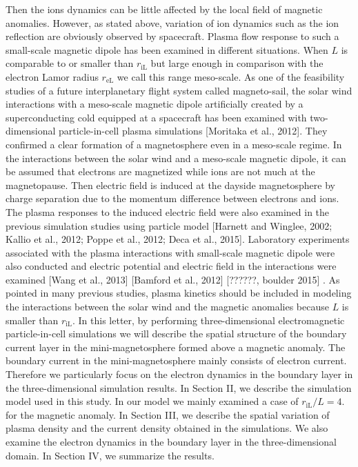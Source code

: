 \documentclass{EPS}
\begin{document}
Then the ions dynamics can be little affected by the local field of magnetic anomalies. However, as stated above, 
variation of ion dynamics such as the ion reflection are obviously observed by spacecraft. 
Plasma flow response to such a small-scale magnetic dipole has been examined in different situations. 
When $L$ is comparable to or smaller than $r_\mathrm{iL}$ 
but large enough in comparison with the electron Lamor radius $r_\mathrm{eL}$ 
we call this range meso-scale. 
As one of the feasibility studies of a future interplanetary flight system called magneto-sail, 
the solar wind interactions with a meso-scale magnetic dipole artificially created by a 
superconducting cold equipped at a spacecraft has been examined with two-dimensional 
particle-in-cell plasma simulations [Moritaka et al., 2012]. 
They confirmed a clear formation of a magnetosphere even in a meso-scale regime. 
In the interactions between the solar wind and a meso-scale magnetic dipole, 
it can be assumed that electrons are magnetized while ions are not much at the magnetopause. 
Then electric field is induced at the dayside magnetosphere by charge separation due to 
the momentum difference between electrons and ions. 
The plasma responses to the induced electric field were also examined 
in the previous simulation studies using particle model 
[Harnett and Winglee, 2002; Kallio et al., 2012; Poppe et al., 2012; Deca et al., 2015]. 
Laboratory experiments associated with the plasma interactions with small-scale magnetic dipole 
were also conducted and electric potential and electric field in the interactions were examined 
[Wang et al., 2013] [Bamford et al., 2012] [??????, boulder 2015] .
 As pointed in many previous studies, plasma kinetics should be included in modeling the interactions 
 between the solar wind and the magnetic anomalies because  $L$ is smaller than
$r_\mathrm{iL}$. 
 In this letter,  by performing three-dimensional electromagnetic particle-in-cell simulations we will 
 describe the spatial structure of the boundary current layer in the mini-magnetosphere formed 
 above a magnetic anomaly. 
 The boundary current in the mini-magnetosphere mainly consists of electron current. 
 Therefore we particularly focus on the electron dynamics in the boundary layer 
 in the three-dimensional simulation results. 
  In Section II, we describe the simulation model used in this study. 
 In our model we mainly examined a case of $r_\mathrm{iL} /L=4$. 
for the magnetic anomaly. 
 In Section III, we describe the spatial variation of plasma density and 
 the current density obtained in the simulations. 
We also examine the electron dynamics in the boundary layer in the three-dimensional domain. 
 In Section IV, we summarize the results.  
\end{document}
